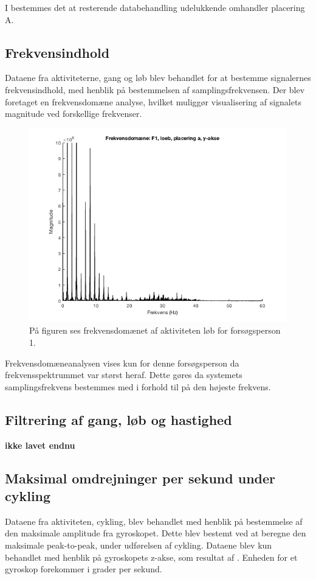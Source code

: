 I  bestemmes det at resterende databehandling udelukkende omhandler placering A.


\subsection{Frekvensindhold}
Dataene fra aktiviteterne, gang og løb blev behandlet for at bestemme signalernes frekvensindhold, med henblik på bestemmelsen af samplingsfrekvensen. Der blev foretaget en frekvensdomæne analyse, hvilket muliggør visualisering af signalets magnitude ved forskellige frekvenser. 

\begin{figure}[H]
	\centering
	\includegraphics[scale=0.68]{figures/bProblemloesning/fft_f1_loeb}
	\caption{På figuren ses frekvensdomænet af aktiviteten løb for forsøgsperson 1.}
	\label{fig:Ap_FFt}
\end{figure}
Frekvensdomæneanalysen vises kun for denne forsøgsperson da frekvensspektrummet var størst heraf. Dette gøres da systemets samplingsfrekvens bestemmes med i forhold til på den højeste frekvens.

\subsection{Filtrering af gang, løb og hastighed}
\textbf{ikke lavet endnu}

\subsection{Maksimal omdrejninger per sekund under cykling}
Dataene fra aktiviteten, cykling, blev behandlet med henblik på bestemmelse af den maksimale amplitude fra gyroskopet. Dette blev bestemt ved at beregne den maksimale peak-to-peak, under udførelsen af cykling. Dataene blev kun behandlet med henblik på gyroskopets z-akse, som resultat af . Enheden for et gyroskop forekommer i grader per sekund.

